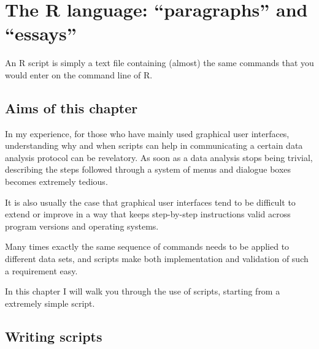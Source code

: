 \documentclass[krantz2]{krantz}\usepackage{knitr}%
\newcommand{\href}[2]{\emph{#2} (\url{#1})}
\begin{document}








\chapter{The R language: ``paragraphs'' and ``essays''}\label{chap:R:scripts}

\begin{VF}
An R script is simply a text file containing (almost) the same commands that you would enter on the command line of R.

\end{VF}


\section{Aims of this chapter}

In my experience, for those who have mainly used graphical user interfaces, understanding why and when scripts can help in communicating a certain data analysis protocol can be revelatory. As soon as a data analysis stops being trivial, describing the steps followed through a system of menus and dialogue boxes becomes extremely tedious.

It is also usually the case that graphical user interfaces tend to be difficult to extend or improve in a way that keeps step-by-step instructions valid across program versions and operating systems.

Many times exactly the same sequence of commands needs to be applied to different data sets, and scripts make both implementation and validation of such a requirement easy.

In this chapter I will walk you through the use of \Rpgrm scripts, starting from a extremely simple script.

\section{Writing scripts}
\end{document}
